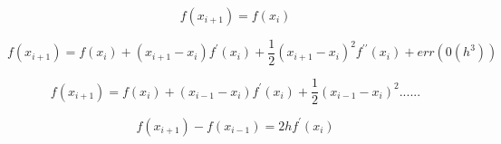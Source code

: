 \documentclass[12pt]{article}
\begin{document}
\begin{equation}
 f(x_{i+1}) = f(x_i)
\end {equation}

\begin{equation}
 f(x_{i+1}) = f(x_i) + (x_{i+1} - x_i)f^{\prime}(x_i) + \frac{1}{2}(x_{i+1} - x_i)^2 f^{\prime\prime}(x_i) + err(0(h^3))
\end {equation}

\begin{equation}
 f(x_{i+1}) = f(x_i) + (x_{i-1} - x_i) f^{\prime}(x_i) + \frac{1}{2}(x_{i-1} - x_i)^2 ...... 
\end {equation}

\begin{equation}
 f(x_{i+1}) - f(x_{i-1}) = 2hf^{\prime}(x_i)
\end {equation}
\end{document}

